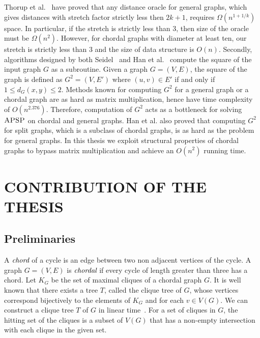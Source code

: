 \documentclass[MS,synopsis]{iitmdiss}
\begin{document}
 
 Thorup et al.~\cite{thorup} have proved that any distance oracle for general graphs, which gives distances with stretch factor strictly less then $2k+1$,
 requires $\Omega(n^{1+1/k})$ space. In particular, if the stretch is strictly less than 3, then size of the oracle must be $\Omega(n^2)$. However, for  chordal graphs with
 diameter at least ten, our stretch is strictly less than 3 and the size of data structure is $O(n)$.
 Secondly, algorithms designed by both Seidel~\cite{seidel} and Han et al.~\cite{han} compute the square of the input graph $G$ as a subroutine. Given a graph
 $G = (V,E)$, the square of the graph is defined as $G^2 = (V,E')$ where $(u,v) \in E'$ if and only if \mbox{$1 \leq d_G(x,y) \leq 2$}. Methods known for computing
 $G^2$ for a general graph or a chordal graph are as hard as matrix multiplication, hence have time complexity of $O(n^{2.376})$. Therefore, computation of 
 $G^2$ acts as a bottleneck for solving $\textsc{APSP}$ on chordal and general graphs. Han et al.\cite{han} also proved that computing $G^2$ for split graphs,
 which is a subclass of chordal graphs, is as hard as the problem for general graphs. In this thesis we exploit structural properties of chordal graphs
 to bypass matrix multiplication and achieve an $O(n^2)$ running time. 
 
%  
 

 \section{CONTRIBUTION OF THE THESIS}
 \subsection{Preliminaries}
 A $\emph{chord}$ of a cycle is an edge between two non adjacent vertices of the cycle.  
 A graph \mbox{$G = (V,E)$} is $\emph{chordal}$ if every cycle of length greater than three has a chord.    
 Let  $K_G$ be the set of maximal cliques of a chordal graph $G$.
 It is well known that there exists a tree $T$, called the clique tree of $G$, 
 whose vertices correspond bijectively to the elements of $K_G$ and for each $v \in V(G)$. 
 We can construct a clique tree $T$ of $G$ in linear time~\cite{cliquetree}. 
 For a set of cliques in $G$, the hitting set of the cliques is a subset of $V(G)$ that has a non-empty intersection with each clique in the given set.
 
\end{document}
